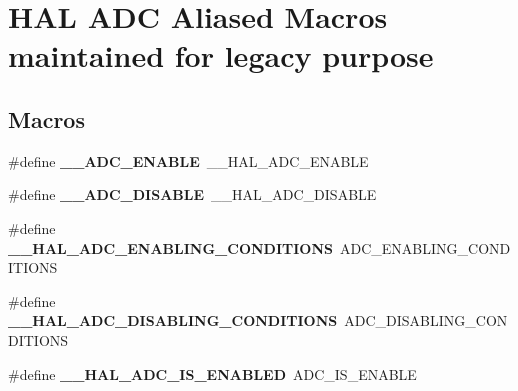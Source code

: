 \hypertarget{group___h_a_l___a_d_c___aliased___macros}{}\section{H\+AL A\+DC Aliased Macros maintained for legacy purpose}
\label{group___h_a_l___a_d_c___aliased___macros}
\subsection*{Macros}
\begin{DoxyCompactItemize}
\item 
\mbox{\label{group___h_a_l___a_d_c___aliased___macros_gade2e452da8695130dbc0b8b516ec16ff}} 
\#define {\bfseries \+\_\+\+\_\+\+A\+D\+C\+\_\+\+E\+N\+A\+B\+LE}~\+\_\+\+\_\+\+H\+A\+L\+\_\+\+A\+D\+C\+\_\+\+E\+N\+A\+B\+LE
\item 
\mbox{\label{group___h_a_l___a_d_c___aliased___macros_ga6a8dfa9e047c1ac8f70d2fe3ae3fd4dc}} 
\#define {\bfseries \+\_\+\+\_\+\+A\+D\+C\+\_\+\+D\+I\+S\+A\+B\+LE}~\+\_\+\+\_\+\+H\+A\+L\+\_\+\+A\+D\+C\+\_\+\+D\+I\+S\+A\+B\+LE
\item 
\mbox{\label{group___h_a_l___a_d_c___aliased___macros_gaf09405aa65148ec822984b2d81992596}} 
\#define {\bfseries \+\_\+\+\_\+\+H\+A\+L\+\_\+\+A\+D\+C\+\_\+\+E\+N\+A\+B\+L\+I\+N\+G\+\_\+\+C\+O\+N\+D\+I\+T\+I\+O\+NS}~A\+D\+C\+\_\+\+E\+N\+A\+B\+L\+I\+N\+G\+\_\+\+C\+O\+N\+D\+I\+T\+I\+O\+NS
\item 
\mbox{\label{group___h_a_l___a_d_c___aliased___macros_ga758e02a9d4e37528e42ff60eff476cbf}} 
\#define {\bfseries \+\_\+\+\_\+\+H\+A\+L\+\_\+\+A\+D\+C\+\_\+\+D\+I\+S\+A\+B\+L\+I\+N\+G\+\_\+\+C\+O\+N\+D\+I\+T\+I\+O\+NS}~A\+D\+C\+\_\+\+D\+I\+S\+A\+B\+L\+I\+N\+G\+\_\+\+C\+O\+N\+D\+I\+T\+I\+O\+NS
\item 
\mbox{\label{group___h_a_l___a_d_c___aliased___macros_ga2c78554d5c9d8311297ea8fb01866309}} 
\#define {\bfseries \+\_\+\+\_\+\+H\+A\+L\+\_\+\+A\+D\+C\+\_\+\+I\+S\+\_\+\+E\+N\+A\+B\+L\+ED}~A\+D\+C\+\_\+\+I\+S\+\_\+\+E\+N\+A\+B\+LE

\end{DoxyCompactItemize}

